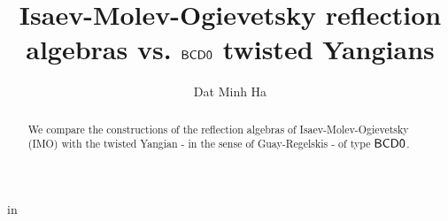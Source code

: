 

\setcounter{section}{-1}


\renewcommand{\simpleroots}{\mathbb{I}}



    \title{Isaev-Molev-Ogievetsky reflection algebras vs. $\mathsf{B}\mathsf{C}\mathsf{D}\mathsf{0}$ twisted Yangians}
    
    \author{Dat Minh Ha}
    \maketitle
    
    \begin{abstract}
        We compare the constructions of the reflection algebras of Isaev-Molev-Ogievetsky (IMO) with the twisted Yangian - in the sense of Guay-Regelskis - of type $\mathsf{B}\mathsf{C}\mathsf{D}\mathsf{0}$.
    \end{abstract}
    
    {
    \hypersetup{} 
    \tableofcontents %
    }

    

    

    

    
    \printbibliography

in